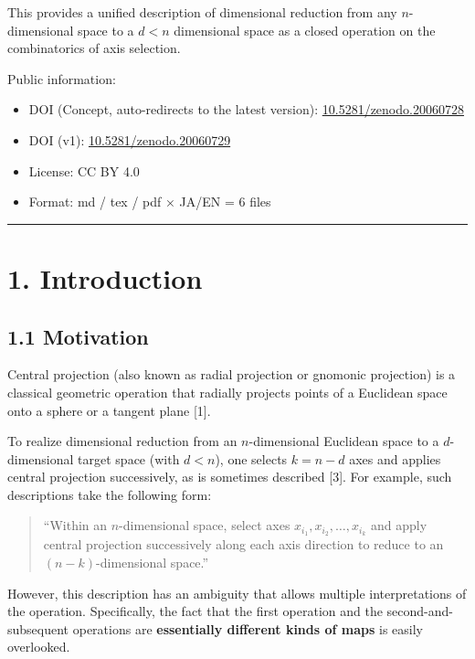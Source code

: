 \documentclass[a4paper,11pt]{article}
\theoremstyle{definition}
\theoremstyle{remark}
\providecommand{\tightlist}{%
  \setlength{\itemsep}{0pt}\setlength{\parskip}{0pt}}
\begin{document}
This provides a unified description of dimensional reduction from any
\(n\)-dimensional space to a \(d < n\) dimensional space as a closed
operation on the combinatorics of axis selection.

Public information:

\begin{itemize}
\tightlist
\item
  DOI (Concept, auto-redirects to the latest version):
  \href{https://doi.org/10.5281/zenodo.20060728}{10.5281/zenodo.20060728}
\item
  DOI (v1):
  \href{https://doi.org/10.5281/zenodo.20060729}{10.5281/zenodo.20060729}
\item
  License: CC BY 4.0
\item
  Format: md / tex / pdf × JA/EN = 6 files
\end{itemize}

\begin{center}\rule{0.5\linewidth}{0.5pt}\end{center}

\section{1. Introduction}\label{introduction}

\subsection{1.1 Motivation}\label{motivation}

Central projection (also known as radial projection or gnomonic
projection) is a classical geometric operation that radially projects
points of a Euclidean space onto a sphere or a tangent plane {[}1{]}.

To realize dimensional reduction from an \(n\)-dimensional Euclidean
space to a \(d\)-dimensional target space (with \(d < n\)), one selects
\(k = n - d\) axes and applies central projection successively, as is
sometimes described {[}3{]}. For example, such descriptions take the
following form:

\begin{quote}
``Within an \(n\)-dimensional space, select axes
\(x_{i_1}, x_{i_2}, \ldots, x_{i_k}\) and apply central projection
successively along each axis direction to reduce to an
\((n-k)\)-dimensional space.''
\end{quote}

However, this description has an ambiguity that allows multiple
interpretations of the operation. Specifically, the fact that the first
operation and the second-and-subsequent operations are
\textbf{essentially different kinds of maps} is easily overlooked.
\end{document}
